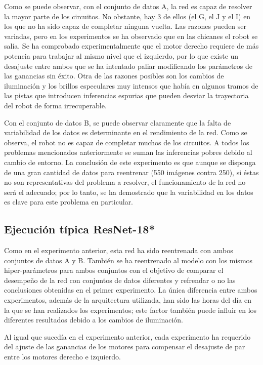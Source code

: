 Como se puede observar, con el conjunto de datos A, la red es capaz de resolver la mayor parte de los circuitos. No obstante, hay 3 de ellos (el G, el J y el I) en los que no ha sido capaz de completar ninguna vuelta. Las razones pueden ser variadas, pero en los experimentos se ha observado que en las chicanes el robot se salía. Se ha comprobado experimentalmente que el motor derecho requiere de más potencia para trabajar al mismo nivel que el izquierdo, por lo que existe un desajuste entre ambos que se ha intentado paliar modificando los parámetros de las ganancias sin éxito. Otra de las razones posibles son los cambios de iluminación y los brillos especulares muy intensos que había en algunos tramos de las pistas que introducen inferencias espurias que pueden desviar la trayectoria del robot de forma irrecuperable.

Con el conjunto de datos B, se puede observar claramente que la falta de variabilidad de los datos es determinante en el rendimiento de la red. Como se observa, el robot no es capaz de completar muchos de los circuitos. A todos los problemas mencionados anteriormente se suman las inferencias pobres debido al cambio de entorno. La conclusión de este experimento es que aunque se disponga de una gran cantidad de datos para reentrenar (550 imágenes contra 250), si éstas no son representativas del problema a resolver, el funcionamiento de la red no será el adecuado; por lo tanto, se ha demostrado que la variabilidad en los datos es clave para este problema en particular.

\subsection{Ejecución típica ResNet-18*}

Como en el experimento anterior, esta red ha sido reentrenada con ambos conjuntos de datos A y B. También se ha reentrenado al modelo con los mismos hiper-parámetros para ambos conjuntos con el objetivo de comparar el desempeño de la red con conjuntos de datos diferentes y refrendar o no las conclusiones obtenidas en el primer experimento. La única diferencia entre ambos experimentos, además de la arquitectura utilizada, han sido las horas del día en la que se han realizados los experimentos; este factor también puede influir en los diferentes resultados debido a los cambios de iluminación.

Al igual que sucedía en el experimento anterior, cada experimento ha requerido del ajuste de las ganancias de los motores para compensar el desajuste de par entre los motores derecho e izquierdo.

